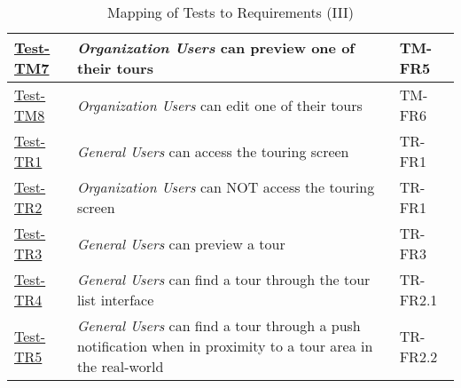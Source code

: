 \documentclass[12pt, titlepage]{article}
\begin{document}
\begin{table}[htpb!]
\begin{tabular}{|l|p{8cm}|p{3cm}|}
    \hline
    \hyperref[itm:Test-TM7]{Test-TM7} & \textit{Organization Users} can preview one of their tours                                                            & TM-FR5   \\
    \hline
    \hyperref[itm:Test-TM8]{Test-TM8} & \textit{Organization Users} can edit one of their tours                                                               & TM-FR6   \\
    \hline
    \hyperref[itm:Test-TR1]{Test-TR1} & \textit{General Users} can access the touring screen                                                                  & TR-FR1   \\
    \hline
    \hyperref[itm:Test-TR2]{Test-TR2} & \textit{Organization Users} can NOT access the touring screen                                                         & TR-FR1   \\
    \hline
    \hyperref[itm:Test-TR3]{Test-TR3} & \textit{General Users} can preview a tour                                                                             & TR-FR3   \\
    \hline
    \hyperref[itm:Test-TR4]{Test-TR4} & \textit{General Users} can find a tour through the tour list interface                                                & TR-FR2.1 \\
    \hline
    \hyperref[itm:Test-TR5]{Test-TR5} & \textit{General Users} can find a tour through a push notification when in proximity to a tour area in the real-world & TR-FR2.2 \\
    \hline
  \end{tabular}
  \caption{Mapping of Tests to Requirements (III)}
  \label{tab:test_requirements3}
\end{table}
\end{document}
